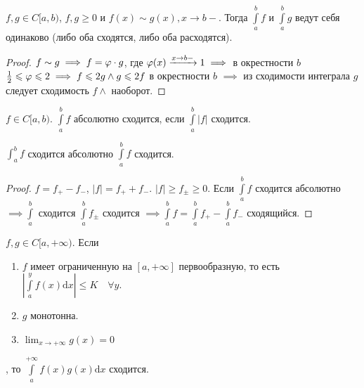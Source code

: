 \begin{consequence}
    $f, g \in C[a, b)$,  $f, g \ge 0$ и $f(x) \sim g(x), x \to b-$. Тогда  $\int\limits_a^b f$ и  $\int\limits_a^b g$ ведут себя одинаково (либо оба сходятся, либо оба расходятся).
\end{consequence}
\begin{proof}
    $f \sim g \implies f = \varphi \cdot g$, где  $\varphi(x) \xrightarrow{x \to b-} 1 \implies$ в окрестности $b$  $\frac{1}{2} \leqslant \varphi \leqslant 2 \implies f \leqslant 2g \land g \leqslant 2f$ в окрестности $b$  $\implies$ из сходимости интеграла  $g$ следует сходимость $f \land$ наоборот. 
\end{proof}
\begin{definition}
    $f \in C[a, b)$. $\int\limits_a^b f$ абсолютно сходится, если  $\int\limits_a^b |f|$ сходится.
\end{definition}
\begin{theorem}
    $\int_a^b f$ сходится абсолютно  $\int\limits_a^b f$ сходится.
\end{theorem}
\begin{proof}
    $f = f_+ - f_-$,  $|f| = f_+ + f_-$.  $|f| \ge f_\pm \ge 0$. Если $\int\limits_a^b f$ сходится абсолютно  $\implies \int\limits_a^b$ сходится  $\int\limits_a^b f_{\pm}$ сходится  $\implies \int\limits_a^b f = \int\limits_a^b f_+ - \int\limits_a^b f_-$ сходящийся.
\end{proof}
\begin{theorem}
    $f, g \in C[a, +\infty)$. Если
    \begin{enumerate}
        \item $f$ имеет ограниченную на  $[a, +\infty]$ первообразную, то есть  $\left| \int\limits_a^y f(x) \mathrm{d}x \right| \le K \quad \forall y$.
        \item $g$ монотонна.
        \item  $\lim_{x \to +\infty} g(x) = 0$
    \end{enumerate}, то $\int\limits_a^{+\infty} f(x)g(x) \mathrm{d}x$ сходится.
\end{theorem}
